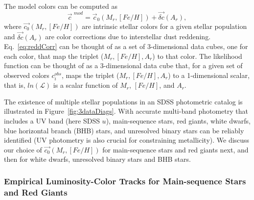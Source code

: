 The model colors can be computed as
\begin{equation}
  \label{eq:reddCorr} 
                       \vec{c}^{\,\,mod}  = \vec{c}_0(M_r, [Fe/H]) + \vec{\delta c}(A_r),
\end{equation}
where $\vec{c_0}(M_r, [Fe/H])$ are intrinsic stellar colors for a given stellar population and $\vec{\delta c}(A_r)$ are
color corrections due to interstellar dust reddening. Eq.~\ref{eq:reddCorr} can be thought of as a set of 
3-dimensional data cubes, one for each color, that map the triplet ($M_r, [Fe/H], A_r$) to that color. 
The likelihood function can be thought of as a  3-dimensional data cube that, for a given set of observed colors $c^{obs}_i$,
maps the triplet ($M_r, [Fe/H], A_r$) to a 1-dimensional scalar, that is, $ln (\mathcal{L})$ is a scalar function of
$M_r$, $[Fe/H]$, and $A_r$.
        
The existence of multiple stellar populations in an SDSS photometric catalog is illustrated in Figure~\ref{fig:3dataDiags}.
With accurate multi-band photometry that includes a UV band (here SDSS $u$), main-sequence stars, red giants,
white dwarfs, blue horizontal branch (BHB) stars, and unresolved binary stars can be reliably identified (UV photometry
is also crucial for constraining metallicity). We discuss our choice of $\vec{c_0}(M_r, [Fe/H])$ for main-sequence stars
and red giants next, and then for white dwarfs, unresolved binary stars and BHB stars. 

\subsubsection{Empirical Luminosity-Color Tracks for Main-sequence Stars and Red Giants}

